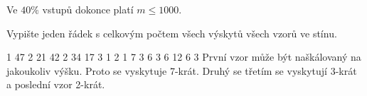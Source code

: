 \smallskip

\noindent
Ve $40\%$ vstupů dokonce platí $m \leq 1000$.


Vypište jeden řádek s celkovým počtem všech výskytů
všech vzorů ve stínu.



1 47
2 21 42
2 34 17
3 1 2 1
7 3 6 3 6 12 6 3
\sampleCOMMENT
První vzor může být naškálovaný na jakoukoliv výšku.
Proto se vyskytuje 7-krát. Druhý se třetím se
vyskytují 3-krát a poslední vzor 2-krát.
\sampleEND



